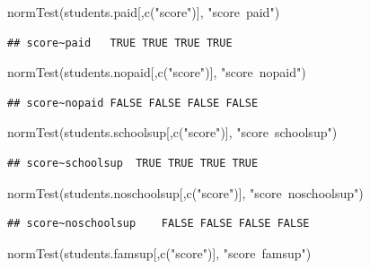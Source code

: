 \documentclass[]{article}
\newenvironment{Shaded}{\begin{snugshade}}{\end{snugshade}}
\newcommand{\KeywordTok}[1]{\textcolor[rgb]{0.94,0.87,0.69}{#1}}
\newcommand{\NormalTok}[1]{\textcolor[rgb]{0.80,0.80,0.80}{#1}}
\newcommand{\StringTok}[1]{\textcolor[rgb]{0.80,0.58,0.58}{#1}}
\begin{document}
\begin{Shaded}
\begin{Highlighting}[]
\KeywordTok{normTest}\NormalTok{(students.paid[,}\KeywordTok{c}\NormalTok{(}\StringTok{"score"}\NormalTok{)], }\StringTok{"score~paid"}\NormalTok{)}
\end{Highlighting}
\end{Shaded}

\begin{verbatim}
## score~paid   TRUE TRUE TRUE TRUE     
\end{verbatim}

\begin{Shaded}
\begin{Highlighting}[]
\KeywordTok{normTest}\NormalTok{(students.nopaid[,}\KeywordTok{c}\NormalTok{(}\StringTok{"score"}\NormalTok{)], }\StringTok{"score~nopaid"}\NormalTok{)}
\end{Highlighting}
\end{Shaded}

\begin{verbatim}
## score~nopaid FALSE FALSE FALSE FALSE     
\end{verbatim}

\begin{Shaded}
\begin{Highlighting}[]
\KeywordTok{normTest}\NormalTok{(students.schoolsup[,}\KeywordTok{c}\NormalTok{(}\StringTok{"score"}\NormalTok{)], }\StringTok{"score~schoolsup"}\NormalTok{)}
\end{Highlighting}
\end{Shaded}

\begin{verbatim}
## score~schoolsup  TRUE TRUE TRUE TRUE     
\end{verbatim}

\begin{Shaded}
\begin{Highlighting}[]
\KeywordTok{normTest}\NormalTok{(students.noschoolsup[,}\KeywordTok{c}\NormalTok{(}\StringTok{"score"}\NormalTok{)], }\StringTok{"score~noschoolsup"}\NormalTok{)}
\end{Highlighting}
\end{Shaded}

\begin{verbatim}
## score~noschoolsup    FALSE FALSE FALSE FALSE     
\end{verbatim}

\begin{Shaded}
\begin{Highlighting}[]
\KeywordTok{normTest}\NormalTok{(students.famsup[,}\KeywordTok{c}\NormalTok{(}\StringTok{"score"}\NormalTok{)], }\StringTok{"score~famsup"}\NormalTok{)}
\end{Highlighting}
\end{Shaded}
\end{document}

